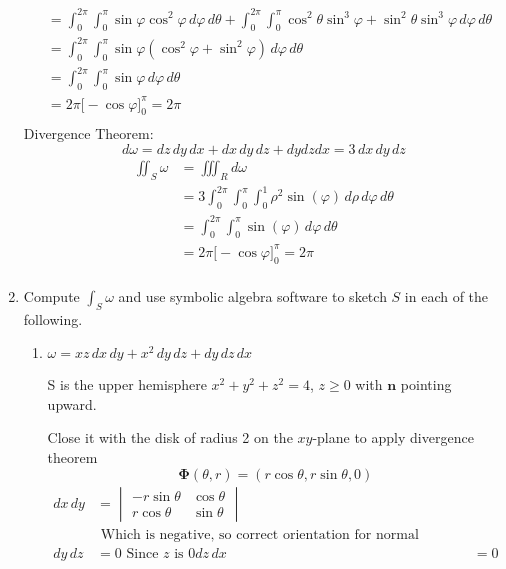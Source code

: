 \documentclass{article}
\begin{document}
\begin{enumerate}
\begin{align*}
        &= \int_0^{2\pi} \int_0^{\pi} \sin \varphi \cos^2 \varphi \, d\varphi \, d\theta + \int_0^{2\pi} \int_0^{\pi} \cos^2\theta \sin^3\varphi + \sin^2\theta \sin^3\varphi \, d\varphi \, d\theta \\
        &= \int_0^{2\pi} \int_0^{\pi} \sin \varphi (\cos^2 \varphi + \sin^2 \varphi) \, d\varphi \, d\theta  \\
        &= \int_0^{2\pi} \int_0^{\pi} \sin \varphi  \, d\varphi \, d\theta  \\
        &= 2\pi \bigg[ -\cos \varphi\bigg]_0^{\pi} = 2\pi \\
    \end{align*}
    Divergence Theorem:
    \[ d\omega = dz \, dy \, dx + dx \, dy \, dz + dy dz dx = 3 \, dx \, dy \, dz \]
    \begin{align*}
        \iint_S \omega &= \iiint_R d \omega \\
        &= 3 \int_0^{2\pi} \int_0^{\pi} \int_0^1 \rho^2 \sin(\varphi) \, d\rho \, d\varphi \, d\theta \\
        &= \int_0^{2\pi} \int_0^{\pi} \sin(\varphi) \, d\varphi \, d\theta \\
        &= 2\pi \bigg[ -\cos \varphi\bigg]_0^{\pi} = 2\pi \\
    \end{align*}

    \newpage
    \item Compute $\displaystyle \int_S \omega$ and use symbolic algebra software to sketch $S$ in each of the following.
    \begin{enumerate}
        \item $\omega = xz \, dx \, dy + x^2 \, dy \, dz + dy \, dz \, dx$
  
        S is the upper hemisphere $x^2 + y^2 + z^2 = 4$, $z \geq 0$ with $\boldsymbol n$ pointing upward.
        
        Close it with the disk of radius 2 on the $xy$-plane to apply divergence theorem
        \[ \boldsymbol \Phi(\theta, r) = (r \cos \theta, r \sin \theta, 0) \]
        \begin{align*}
            dx\, dy &= \begin{vmatrix} -r\sin \theta & \cos \theta \\ r \cos \theta &  \sin \theta \end{vmatrix} \\
            &\text{ Which is negative, so correct orientation for normal pointing down.} \\
            dy\, dz &= 0 \text{ Since $z$ is 0}
            dz\, dx &= 0 
        \end{align*}


\end{enumerate}
\end{enumerate}
\end{document}
